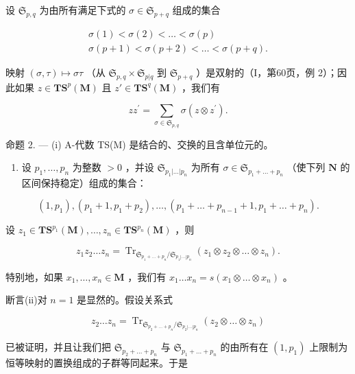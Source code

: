 设 \(\mathfrak{S}_{p,q}\) 为由所有满足下式的 \(\sigma \in \mathfrak{S}_{p + q}\) 组成的集合

\[
\begin{array}{l} \sigma (1) <   \sigma (2) <   \ldots <   \sigma (p) \\ \sigma (p + 1) <   \sigma (p + 2) <   \ldots <   \sigma (p + q). \end{array}
\]

映射 \((\sigma, \tau) \mapsto \sigma \tau\) （从 \(\mathfrak{S}_{p,q} \times \mathfrak{S}_{p|q}\) 到 \(\mathfrak{S}_{p+q}\) ）是双射的（I，第60页，例 2）；因此如果 \(z \in \mathbf{T}\mathbf{S}^p(\mathbf{M})\) 且 \(z' \in \mathbf{T}\mathbf{S}^q(\mathbf{M})\) ，我们有

\[
z z ^ {\prime} = \sum_ {\sigma \in \mathfrak {S} _ {p, q}} \sigma (z \otimes z ^ {\prime}).\tag{5}
\]

命题 2. --- (i) A-代数 TS(M) 是结合的、交换的且含单位元的。

\begin{enumerate}
\def\labelenumi{(\roman{enumi})}
\setcounter{enumi}{1}
\tightlist
\item
  设 \(p_1, \ldots, p_n\) 为整数 \(> 0\) ，并设 \(\mathfrak{S}_{p_1 | \ldots | p_n}\) 为所有 \(\sigma \in \mathfrak{S}_{p_1 + \ldots + p_n}\) （使下列 \(\mathbf{N}\) 的区间保持稳定）组成的集合：
\end{enumerate}

\[
\left(1, p _ {1}\right), \left(p _ {1} + 1, p _ {1} + p _ {2}\right), \dots , \left(p _ {1} + \dots + p _ {n - 1} + 1, p _ {1} + \dots + p _ {n}\right).
\]

设 \(z_{1}\in \mathbf{T}\mathbf{S}^{p_{1}}(\mathbf{M}),\ldots ,z_{n}\in \mathbf{T}\mathbf{S}^{p_{n}}(\mathbf{M})\) ，则

\[
z _ {1} z _ {2} \dots z _ {n} = \operatorname{Tr} _ {\mathfrak {S} _ {p _ {1} + \dots + p _ {n}} / \mathfrak {S} _ {p _ {1} | \dots | p _ {n}}} (z _ {1} \otimes z _ {2} \otimes \dots \otimes z _ {n}).
\]

特别地，如果 \(x_1, \ldots, x_n \in \mathbf{M}\) ，我们有 \(x_1 \ldots x_n = s(x_1 \otimes \ldots \otimes x_n)\) 。

断言(ii)对 \(n = 1\) 是显然的。假设关系式

\[
z _ {2} \dots z _ {n} = \operatorname{Tr} _ {\mathfrak {S} _ {p _ {2} + \dots + p _ {n}} / \mathfrak {S} _ {p _ {2} | \dots | p _ {n}}} (z _ {2} \otimes \dots \otimes z _ {n})
\]

已被证明，并且让我们把 \(\mathfrak{S}_{p_2 + \ldots + p_n}\) 与 \(\mathfrak{S}_{p_1 + \ldots + p_n}\) 的由所有在 \((1, p_1)\) 上限制为恒等映射的置换组成的子群等同起来。于是

